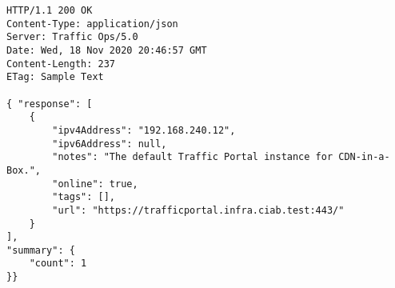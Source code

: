 \begin{codelisting}
\begin{verbatim}
HTTP/1.1 200 OK
Content-Type: application/json
Server: Traffic Ops/5.0
Date: Wed, 18 Nov 2020 20:46:57 GMT
Content-Length: 237
ETag: Sample Text

{ "response": [
	{
		"ipv4Address": "192.168.240.12",
		"ipv6Address": null,
		"notes": "The default Traffic Portal instance for CDN-in-a-Box.",
		"online": true,
		"tags": [],
		"url": "https://trafficportal.infra.ciab.test:443/"
	}
],
"summary": {
	"count": 1
}}
\end{verbatim}
\end{codelisting}
